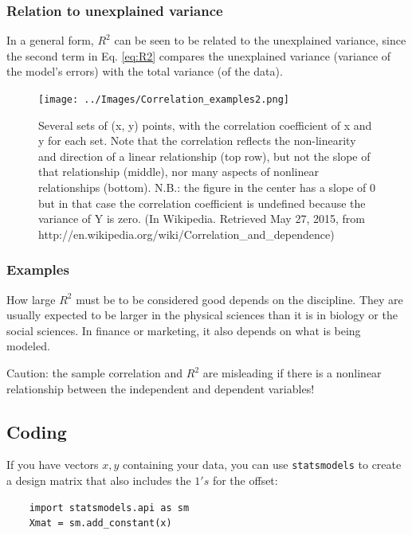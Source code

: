 \subsubsection{Relation to unexplained variance}

In a general form, $R^2$ can be seen to be related to the unexplained variance, since the second term in Eq. \ref{eq:R2} compares the unexplained variance (variance of the model's errors) with the total variance (of the data).

\begin{figure}
  \centering
  \texttt{[image: ../Images/Correlation\_examples2.png]}\\
  \caption{Several sets of (x, y) points, with the correlation coefficient of x and y for each set. Note that the correlation reflects the non-linearity and direction of a linear relationship (top row), but not the slope of that relationship (middle), nor many aspects of nonlinear relationships (bottom). N.B.: the figure in the center has a slope of 0 but in that case the correlation coefficient is undefined because the variance of Y is zero. (In Wikipedia. Retrieved May 27, 2015, from http://en.wikipedia.org/wiki/Correlation\_and\_dependence)}\label{fig:correlation}
\end{figure}

\subsubsection{Examples}

How large $R^2$ must be to be considered good depends on the discipline. They are usually expected to be larger in the physical sciences than it is in biology or the social sciences. In finance or marketing, it also depends on what is being modeled.

Caution: the sample correlation and $R^2$ are misleading if there is a nonlinear relationship between the independent and dependent variables!


\subsection{Coding}

If you have vectors $x,y$ containing your data, you can use \lstinline{statsmodels} to create a design matrix that also includes the $1's$ for the offset:

\begin{lstlisting}
    import statsmodels.api as sm
    Xmat = sm.add_constant(x)
\end{lstlisting}


